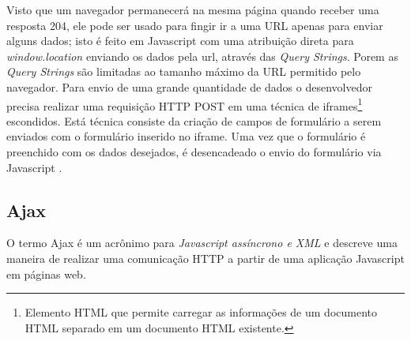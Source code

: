 Visto que um navegador permanecerá na mesma página quando receber uma resposta 204, ele pode ser usado para fingir ir a uma URL apenas para enviar alguns dados; isto é feito em Javascript com uma atribuição direta para \emph{window.location} enviando os dados pela url, através das \emph{Query Strings}. Porem as \emph{Query Strings} são limitadas ao tamanho máximo da URL permitido pelo navegador. Para envio de uma grande quantidade de dados o desenvolvedor precisa realizar uma requisição HTTP POST em uma técnica de iframes\footnote{Elemento HTML que permite carregar as informações de um documento HTML separado em um documento HTML existente.} escondidos. Está técnica consiste da criação de campos de formulário a serem enviados com o formulário inserido no iframe. Uma vez que o formulário é preenchido com os dados desejados, é desencadeado o envio do formulário via Javascript \cite{powell2008ajax}.


\subsection{Ajax}

O termo Ajax é um acrônimo para \emph{Javascript assíncrono e XML} \cite{Garrett2005} e descreve uma maneira de realizar uma comunicação HTTP a partir de uma aplicação Javascript em páginas web.







